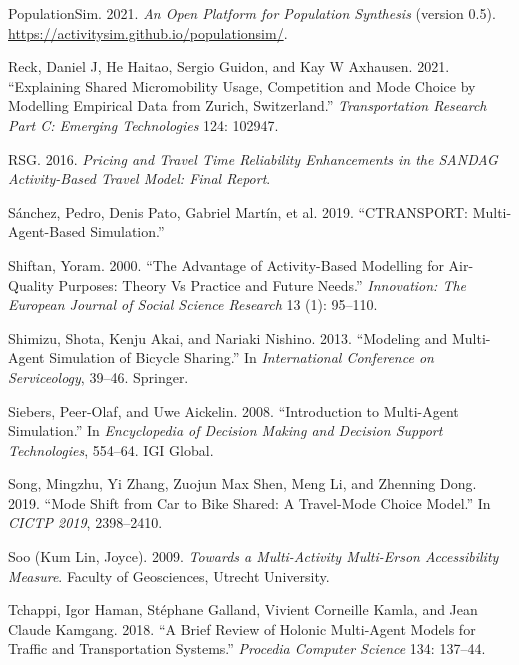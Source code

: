 \documentclass[12pt, oneside, openright]{byuthesis}
\newlength{\cslhangindent}
\newlength{\cslentryspacingunit} %
\newenvironment{CSLReferences}[2] %
 {%
  \setlength{\parindent}{0pt}
  \ifodd #1
  \let\oldpar\par
  \def\par{\hangindent=\cslhangindent\oldpar}
  \fi
  \setlength{\parskip}{#2\cslentryspacingunit}
 }%
 {}
\begin{document}
\begin{CSLReferences}{1}{0}
\leavevmode{}%
PopulationSim. 2021. \emph{An Open Platform for Population Synthesis} (version 0.5). \url{https://activitysim.github.io/populationsim/}.

\leavevmode{}%
Reck, Daniel J, He Haitao, Sergio Guidon, and Kay W Axhausen. 2021. {``Explaining Shared Micromobility Usage, Competition and Mode Choice by Modelling Empirical Data from Zurich, Switzerland.''} \emph{Transportation Research Part C: Emerging Technologies} 124: 102947.

\leavevmode{}%
RSG. 2016. \emph{Pricing and Travel Time Reliability Enhancements in the SANDAG Activity-Based Travel Model: Final Report}.

\leavevmode{}%
Sánchez, Pedro, Denis Pato, Gabriel Martín, et al. 2019. {``CTRANSPORT: Multi-Agent-Based Simulation.''}

\leavevmode{}%
Shiftan, Yoram. 2000. {``The Advantage of Activity-Based Modelling for Air-Quality Purposes: Theory Vs Practice and Future Needs.''} \emph{Innovation: The European Journal of Social Science Research} 13 (1): 95--110.

\leavevmode{}%
Shimizu, Shota, Kenju Akai, and Nariaki Nishino. 2013. {``Modeling and Multi-Agent Simulation of Bicycle Sharing.''} In \emph{International Conference on Serviceology}, 39--46. Springer.

\leavevmode{}%
Siebers, Peer-Olaf, and Uwe Aickelin. 2008. {``Introduction to Multi-Agent Simulation.''} In \emph{Encyclopedia of Decision Making and Decision Support Technologies}, 554--64. IGI Global.

\leavevmode{}%
Song, Mingzhu, Yi Zhang, Zuojun Max Shen, Meng Li, and Zhenning Dong. 2019. {``Mode Shift from Car to Bike Shared: A Travel-Mode Choice Model.''} In \emph{CICTP 2019}, 2398--2410.

\leavevmode{}%
Soo (Kum Lin, Joyce). 2009. \emph{Towards a Multi-Activity Multi-Erson Accessibility Measure}. Faculty of Geosciences, Utrecht University.

\leavevmode{}%
Tchappi, Igor Haman, Stéphane Galland, Vivient Corneille Kamla, and Jean Claude Kamgang. 2018. {``A Brief Review of Holonic Multi-Agent Models for Traffic and Transportation Systems.''} \emph{Procedia Computer Science} 134: 137--44.


\end{CSLReferences}
\end{document}
